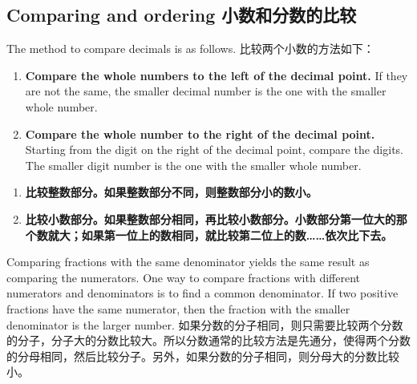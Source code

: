 \subsection{Comparing and ordering 小数和分数的比较}
\begin{paracol}{2}
The method to compare decimals is as follows.
\switchcolumn[1]
比较两个小数的方法如下：
\end{paracol}

\begin{newalg}
\begin{enumerate}
\item {\bf Compare the whole numbers to the left of the decimal point.} If they are not the same, the smaller decimal number is the one with the smaller whole number.
\item {\bf Compare the whole number to the right of the decimal point.} Starting from the digit on the right of the decimal point, compare the digits. The smaller digit number is the one with the smaller whole number.
\end{enumerate}

\begin{enumerate}
\item {\bf 比较整数部分。如果整数部分不同，则整数部分小的数小。} 
\item  {\bf 比较小数部分。如果整数部分相同，再比较小数部分。小数部分第一位大的那个数就大；如果第一位上的数相同，就比较第二位上的数……依次比下去。} 
\end{enumerate}
\end{newalg}


\begin{paracol}{2}
Comparing fractions with the same denominator yields the same result as comparing the numerators. One way to compare fractions with different numerators and denominators is to find a common denominator. If two positive fractions have the same numerator, then the fraction with the smaller denominator is the larger number.
\switchcolumn[1]
如果分数的分子相同，则只需要比较两个分数的分子，分子大的分数比较大。所以分数通常的比较方法是先通分，使得两个分数的分母相同，然后比较分子。另外，如果分数的分子相同，则分母大的分数比较小。
\end{paracol}

